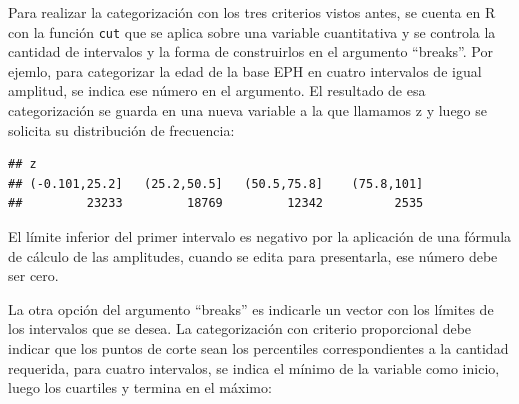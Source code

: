 \documentclass[]{book}
\newenvironment{Shaded}{\begin{snugshade}}{\end{snugshade}}
\newcommand{\DataTypeTok}[1]{\textcolor[rgb]{0.13,0.29,0.53}{#1}}
\newcommand{\DecValTok}[1]{\textcolor[rgb]{0.00,0.00,0.81}{#1}}
\newcommand{\FloatTok}[1]{\textcolor[rgb]{0.00,0.00,0.81}{#1}}
\newcommand{\KeywordTok}[1]{\textcolor[rgb]{0.13,0.29,0.53}{\textbf{#1}}}
\newcommand{\NormalTok}[1]{#1}
\newcommand{\OperatorTok}[1]{\textcolor[rgb]{0.81,0.36,0.00}{\textbf{#1}}}
\newcommand{\StringTok}[1]{\textcolor[rgb]{0.31,0.60,0.02}{#1}}
\begin{document}
Para realizar la categorización con los tres criterios vistos antes, se cuenta en R con la función \texttt{cut} que se aplica sobre una variable cuantitativa y se controla la cantidad de intervalos y la forma de construirlos en el argumento ``breaks''. Por ejemlo, para categorizar la edad de la base EPH en cuatro intervalos de igual amplitud, se indica ese número en el argumento. El resultado de esa categorización se guarda en una nueva variable a la que llamamos z y luego se solicita su distribución de frecuencia:

\begin{Shaded}
\end{Shaded}

\begin{verbatim}
## z
## (-0.101,25.2]   (25.2,50.5]   (50.5,75.8]    (75.8,101] 
##         23233         18769         12342          2535
\end{verbatim}

El límite inferior del primer intervalo es negativo por la aplicación de una fórmula de cálculo de las amplitudes, cuando se edita para presentarla, ese número debe ser cero.

La otra opción del argumento ``breaks'' es indicarle un vector con los límites de los intervalos que se desea. La categorización con criterio proporcional debe indicar que los puntos de corte sean los percentiles correspondientes a la cantidad requerida, para cuatro intervalos, se indica el mínimo de la variable como inicio, luego los cuartiles y termina en el máximo:

\begin{Shaded}
\end{Shaded}
\end{document}
